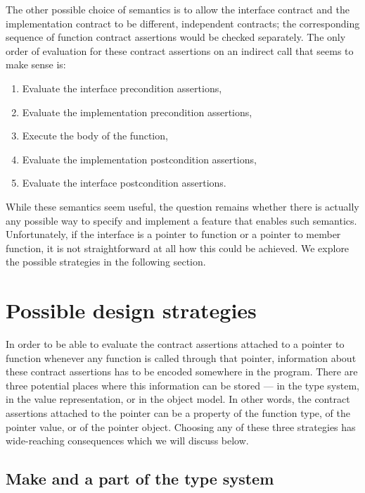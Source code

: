 The other possible choice of semantics is to allow the interface contract and the implementation contract to be different, independent contracts; the corresponding sequence of function contract assertions would be checked separately. The only order of evaluation for these contract assertions on an indirect call that seems to make sense is:
\begin{enumerate}
\item Evaluate the interface precondition assertions,
\item Evaluate the implementation precondition assertions,
\item Execute the body of the function,
\item Evaluate the implementation postcondition assertions,
\item Evaluate the interface postcondition assertions.
\end{enumerate}
While these semantics seem useful, the question remains whether there is actually any possible way to specify and implement a feature that enables such semantics. Unfortunately, if the interface is a pointer to function or a pointer to member function, it is not straightforward at all how this could be achieved. We explore the possible strategies in the following section.

\section{Possible design strategies}

In order to be able to evaluate the contract assertions attached to a pointer to function whenever any function is called through that pointer, information about these contract assertions has to be encoded somewhere in the program. There are three potential places where this information can be stored --- in the type system, in the value representation, or in the object model. In other words, the contract assertions attached to the pointer can be a property of the function type, of the pointer value, or of the pointer object. Choosing any of these three strategies has wide-reaching consequences which we will discuss below.

\subsection{Make  and  a part of the type system}

